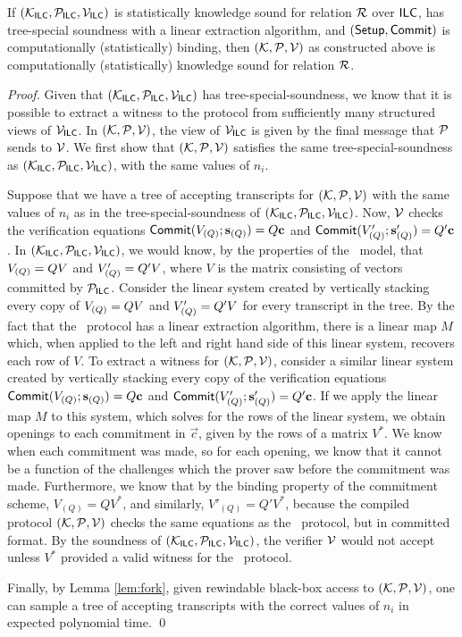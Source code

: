       \begin{theorem}
    If $(\mathcal{K}_{\mathsf{ILC}},\mathcal{P}_{\mathsf{ILC}},\mathcal{V}_{\mathsf{ILC}})$ is statistically knowledge sound for relation $\mathcal{R}$ over $\mathsf{ILC}$, has tree-special soundness with a linear extraction algorithm, and $(\mathsf{Setup},\mathsf{Commit})$ is computationally (statistically) binding, then $(\mathcal{K},\mathcal{P},\mathcal{V})$ as constructed above is computationally (statistically) knowledge sound for relation $\mathcal{R}$.
    \end{theorem}   
    \begin{proof}
Given that $(\mathcal{K}_{\mathsf{ILC}},\mathcal{P}_{\mathsf{ILC}},\mathcal{V}_{\mathsf{ILC}})$ has tree-special-soundness, we know that it is possible to extract a witness to the protocol from sufficiently many structured views of $\mathcal{V}_{\mathsf{ILC}}$. In $(\mathcal{K},\mathcal{P},\mathcal{V})$, the view of $\mathcal{V}_{\mathsf{ILC}}$ is given by the final message that $\mathcal{P}$ sends to $\mathcal{V}$. We first show that $(\mathcal{K},\mathcal{P},\mathcal{V})$ satisfies the same tree-special-soundness as $(\mathcal{K}_{\mathsf{ILC}},\mathcal{P}_{\mathsf{ILC}},\mathcal{V}_{\mathsf{ILC}})$, with the same values of $n_i$.

Suppose that we have a tree of accepting transcripts for $(\mathcal{K},\mathcal{P},\mathcal{V})$ with the same values of $n_i$ as in the tree-special-soundness of $(\mathcal{K}_{\mathsf{ILC}},\mathcal{P}_{\mathsf{ILC}},\mathcal{V}_{\mathsf{ILC}})$. Now, $\mathcal{V}$ checks the verification equations $\mathsf{Commit}(V_{(Q)};\mathbf{s}_{(Q)})= Q \mathbf{c}$ and $\mathsf{Commit}(V'_{(Q)};\mathbf{s}'_{(Q)})= Q' \mathbf{c}$. In $(\mathcal{K}_{\mathsf{ILC}},\mathcal{P}_{\mathsf{ILC}},\mathcal{V}_{\mathsf{ILC}})$, we would know, by the properties of the \ILC\ model, that $V_{(Q)} = Q V$ and $V'_{(Q)} = Q' V$, where $V$ is the matrix consisting of vectors committed by $\mathcal{P}_{\mathsf{ILC}}$. Consider the linear system created by vertically stacking every copy of $V_{(Q)} = Q V$ and $V'_{(Q)} = Q' V$ for every transcript in the tree. By the fact that the \ILC\ protocol has a linear extraction algorithm, there is a linear map $M$ which, when applied to the left and right hand side of this linear system, recovers each row of $V$. To extract a witness for $(\mathcal{K},\mathcal{P},\mathcal{V})$, consider a similar linear system created by vertically stacking every copy of the verification equations $\mathsf{Commit}(V_{(Q)};\mathbf{s}_{(Q)})= Q \mathbf{c}$ and $\mathsf{Commit}(V'_{(Q)};\mathbf{s}'_{(Q)})= Q' \mathbf{c}$. If we apply the linear map $M$ to this system, which solves for the rows of the linear system, we obtain openings to each commitment in $\vec{c}$, given by the rows of a matrix $V^*$. We know when each commitment was made, so for each opening, we know that it cannot be a function of the challenges which the prover saw before the commitment was made. Furthermore, we know that by the binding property of the commitment scheme, $V_{(Q)} = Q V^*$, and similarly, $V'_{(Q)} = Q' V^*$, because the compiled protocol $(\mathcal{K},\mathcal{P},\mathcal{V})$ checks the same equations as the \ILC\ protocol, but in committed format. By the soundness of $(\mathcal{K}_{\mathsf{ILC}},\mathcal{P}_{\mathsf{ILC}},\mathcal{V}_{\mathsf{ILC}})$, the verifier $\mathcal{V}$ would not accept unless $V^*$ provided a valid witness for the \ILC\ protocol.

Finally, by Lemma \ref{lem:fork}, given rewindable black-box access to $(\mathcal{K},\mathcal{P},\mathcal{V})$, one can sample a tree of accepting transcripts with the correct values of $n_i$ in expected polynomial time.
 \qed
\end{proof}

